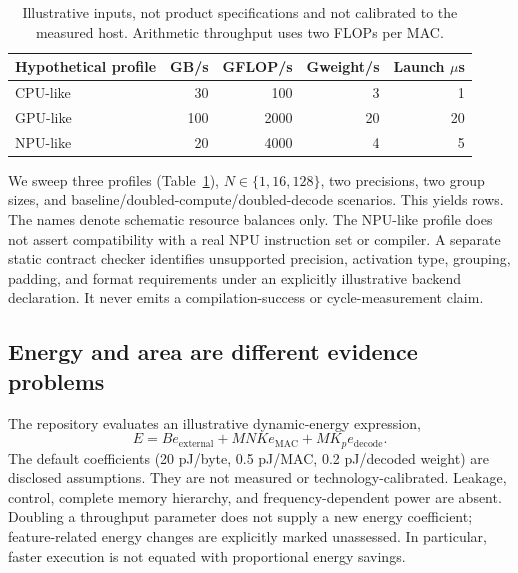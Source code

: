 \documentclass[11pt]{article}
\begin{document}
\begin{table}[t]
\centering
\begin{tabular}{lrrrr}
\toprule
Hypothetical profile & GB/s & GFLOP/s & Gweight/s & Launch $\mu$s\\
\midrule
CPU-like &30&100&3&1\\
GPU-like &100&2000&20&20\\
NPU-like &20&4000&4&5\\
\bottomrule
\end{tabular}
\caption{Illustrative inputs, not product specifications and not calibrated to the
measured host. Arithmetic throughput uses two FLOPs per MAC.}
\label{tab:profiles}
\end{table}

We sweep three profiles (Table~\ref{tab:profiles}), $N\in\{1,16,128\}$, two
precisions, two group sizes, and baseline/doubled-compute/doubled-decode
scenarios. This yields \ScenarioCount{} rows. The names denote schematic resource
balances only. The NPU-like profile does not assert compatibility with a real NPU
instruction set or compiler. A separate static contract checker identifies
unsupported precision, activation type, grouping, padding, and format requirements
under an explicitly illustrative backend declaration. It never emits a
compilation-success or cycle-measurement claim.

\subsection{Energy and area are different evidence problems}
The repository evaluates an illustrative dynamic-energy expression,
\begin{equation}
E=B e_{\mathrm{external}}+MNK e_{\mathrm{MAC}}+MK_p e_{\mathrm{decode}}.
\end{equation}
The default coefficients (20 pJ/byte, 0.5 pJ/MAC, 0.2 pJ/decoded weight) are
disclosed assumptions. They are not measured or technology-calibrated.
Leakage, control, complete memory hierarchy, and frequency-dependent power are
absent. Doubling a throughput parameter does not supply a new energy coefficient;
feature-related energy changes are explicitly marked unassessed. In particular,
faster execution is not equated with proportional energy savings.
\end{document}
